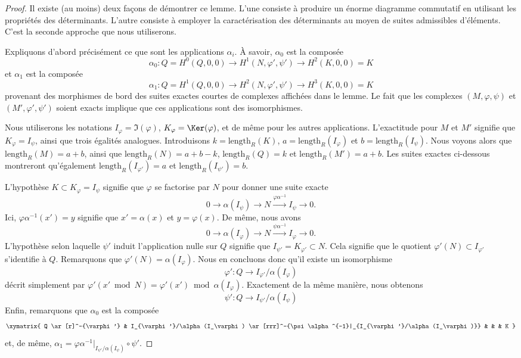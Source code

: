 \begin{proof}
Il existe (au moins) deux façons de démontrer ce lemme. L'une consiste à produire un
énorme diagramme commutatif en utilisant les propriétés des déterminants.
L'autre consiste à employer la caractérisation des déterminants au moyen
de suites admissibles d'éléments. C'est la seconde approche que nous
utiliserons.

\medskip\noindent
Expliquons d'abord précisément ce que sont les applications $\alpha_i$.
À savoir, $\alpha_0$ est la composée
$$
\alpha_0 : Q = H^0(Q, 0, 0) \to H^1(N, \varphi', \psi') \to H^2(K, 0, 0) = K
$$
et $\alpha_1$ est la composée
$$
\alpha_1 : Q = H^1(Q, 0, 0) \to H^2(N, \varphi', \psi') \to H^3(K, 0, 0) = K
$$
provenant des morphismes de bord des suites exactes courtes de complexes
affichées dans le lemme. Le fait que les
complexes $(M, \varphi, \psi)$ et $(M', \varphi', \psi')$ soient exacts
implique que ces applications sont des isomorphismes.

\medskip\noindent
Nous utiliserons les notations $I_\varphi = \Im(\varphi)$,
$K_\varphi = \Ker(\varphi)$, et de même pour les autres applications.
L'exactitude pour $M$ et $M'$
signifie que $K_\varphi = I_\psi$, ainsi que trois égalités analogues.
Introduisons $k = \text{length}_R(K)$, $a = \text{length}_R(I_\varphi)$
et $b = \text{length}_R(I_\psi)$. Nous voyons alors que $\text{length}_R(M) = a + b$,
ainsi que $\text{length}_R(N) = a + b - k$, $\text{length}_R(Q) = k$
et $\text{length}_R(M') = a + b$. Les suites exactes ci-dessous montreront
qu'également $\text{length}_R(I_{\varphi'}) = a$ et
$\text{length}_R(I_{\psi'}) = b$.

\medskip\noindent
L'hypothèse $K \subset K_\varphi = I_\psi$ signifie que
$\varphi$ se factorise par $N$ pour donner une suite exacte
$$
0 \to \alpha(I_\psi) \to N \xrightarrow{\varphi\alpha^{-1}} I_\psi \to 0.
$$
Ici, $\varphi\alpha^{-1}(x') = y$ signifie que $x' = \alpha(x)$ et $y = \varphi(x)$.
De même, nous avons
$$
0 \to \alpha(I_\varphi) \to N \xrightarrow{\psi\alpha^{-1}} I_\varphi \to 0.
$$
L'hypothèse selon laquelle $\psi'$ induit l'application nulle sur
$Q$ signifie que $I_{\psi'} = K_{\varphi'} \subset N$.
Cela signifie que le quotient $\varphi'(N) \subset I_{\varphi'}$
s'identifie à $Q$. Remarquons que $\varphi'(N) = \alpha(I_\varphi)$.
Nous en concluons donc qu'il existe un isomorphisme
$$
\varphi' : Q \to I_{\varphi'}/\alpha(I_\varphi)
$$
décrit simplement par
$\varphi'(x' \bmod N) = \varphi'(x') \bmod \alpha(I_\varphi)$.
Exactement de la même manière, nous obtenons
$$
\psi' : Q \to I_{\psi'}/\alpha(I_\psi)
$$
Enfin, remarquons que $\alpha_0$ est la composée
$$
\xymatrix{
Q \ar[r]^-{\varphi'} &
I_{\varphi'}/\alpha(I_\varphi)
\ar[rrr]^-{\psi\alpha^{-1}|_{I_{\varphi'}/\alpha(I_\varphi)}} & & &
K
}
$$
et, de même,
$\alpha_1 = \varphi\alpha^{-1}|_{I_{\psi'}/\alpha(I_\psi)} \circ \psi'$.


\end{proof}
